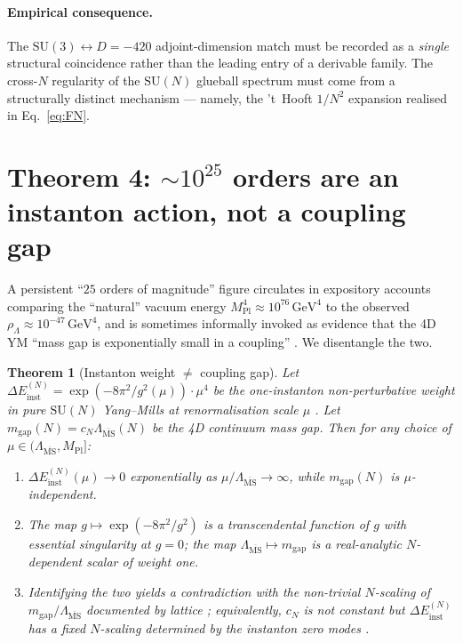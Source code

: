 \documentclass[aps,prl,reprint,superscriptaddress,floatfix,nofootinbib,amssymb]{revtex4-2}
\newtheorem{theorem}{Theorem}
\theoremstyle{definition}
\theoremstyle{remark}
\newcommand{\msb}{\overline{\mathrm{MS}}}
\begin{document}
\paragraph{Empirical consequence.}
The $\mathrm{SU}(3) \leftrightarrow D = -420$ adjoint-dimension match
must be recorded as a \emph{single} structural coincidence rather
than the leading entry of a derivable family.
The cross-$N$ regularity of the $\mathrm{SU}(N)$ glueball spectrum
must come from a structurally distinct mechanism --- namely, the
't~Hooft $1/N^2$ expansion realised in Eq.~\eqref{eq:FN}.

\section{Theorem 4: $\sim\!10^{25}$ orders are an instanton action,
not a coupling gap}\label{sec:T4}

A persistent ``$25$ orders of magnitude'' figure circulates in
expository accounts comparing the ``natural'' vacuum energy
$M_{\mathrm{Pl}}^4 \approx 10^{76}\,\mathrm{GeV}^4$ to the observed
$\rho_\Lambda \approx 10^{-47}\,\mathrm{GeV}^4$, and is sometimes
informally invoked as evidence that the 4D YM ``mass gap is
exponentially small in a coupling'' \cite{Weinberg1989}. We
disentangle the two.

\begin{theorem}[Instanton weight $\ne$ coupling gap]\label{thm:T4}
Let $\Delta E_{\mathrm{inst}}^{(N)} = \exp(-8\pi^2/g^2(\mu)) \cdot
\mu^4$ be the one-instanton non-perturbative weight in pure
$\mathrm{SU}(N)$ Yang--Mills at renormalisation scale $\mu$
\cite{tHooft1976,Coleman1977}. Let $m_{\text{gap}}(N) = c_N
\Lambda_{\msb}(N)$ be the 4D continuum mass gap. Then for any choice
of $\mu \in (\Lambda_{\msb}, M_{\mathrm{Pl}}]$:
\begin{enumerate}
\item[(a)] $\Delta E_{\mathrm{inst}}^{(N)}(\mu) \to 0$ exponentially
as $\mu / \Lambda_{\msb} \to \infty$, while $m_{\text{gap}}(N)$ is
$\mu$-independent.
\item[(b)] The map $g \mapsto \exp(-8\pi^2/g^2)$ is a transcendental
function of $g$ with essential singularity at $g=0$; the map
$\Lambda_{\msb} \mapsto m_{\text{gap}}$ is a real-analytic
$N$-dependent scalar of weight one.
\item[(c)] Identifying the two yields a contradiction with the
non-trivial $N$-scaling of $m_{\text{gap}}/\Lambda_{\msb}$ documented
by lattice \cite{AthenodorouTeper2021}; equivalently, $c_N$ is not
constant but $\Delta E_{\mathrm{inst}}^{(N)}$ has a fixed
$N$-scaling determined by the instanton zero modes
\cite{tHooft1976}.
\end{enumerate}
\end{theorem}
\end{document}
